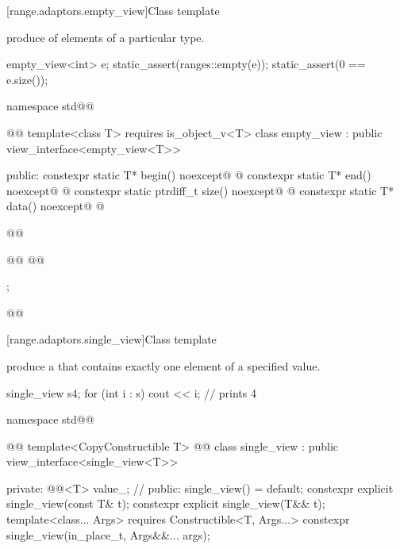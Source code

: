 {[range.adaptors.empty_view]{Class template }

\pnum
{}   produce
  of  elements of
a particular type.

\pnum
\begin{example}
\begin{codeblock}
empty_view<int> e;
static_assert(ranges::empty(e));
static_assert(0 == e.size());
\end{codeblock}
\end{example}

\begin{codeblock}
namespace std@@ { @@
  template<class T>
    requires is_object_v<T>
  class empty_view : public view_interface<empty_view<T>> {
  public:
    constexpr static T* begin() noexcept@\oldtxt{;} @
    constexpr static T* end() noexcept@\oldtxt{;} @
    constexpr static ptrdiff_t size() noexcept@\oldtxt{;} @
    constexpr static T* data() noexcept@\oldtxt{;} @

    @@

    @@
    @@
  };
}@\oldtxt{\}}@
\end{codeblock}

[range.adaptors.single_view]{Class template }

\pnum
{}   produce a
 that contains exactly one element of a
specified value.

\pnum
\begin{example}
\begin{codeblock}
single_view s{4};
for (int i : s)
  cout << i; // prints 4
\end{codeblock}
\end{example}

\begin{codeblock}
namespace std@@ { @@
  template<CopyConstructible T>
    @@
  class single_view : public view_interface<single_view<T>> {
  private:
    @@<T> value_; // \expos
  public:
    single_view() = default;
    constexpr explicit single_view(const T& t);
    constexpr explicit single_view(T&& t);
    template<class... Args>
      requires Constructible<T, Args...>
    constexpr single_view(in_place_t, Args&&... args);

}}
\end{codeblock}}
